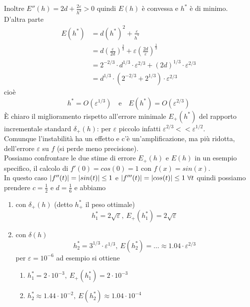 \documentclass[12pt,a4paper]{article}
\DeclarePairedDelimiter{\abs}{\lvert}{\rvert}
\begin{document}
Inoltre $E''(h) = 2d + \frac{2\varepsilon}{h^3} > 0$ quindi $E(h)$ è convessa e $h^*$ è di minimo.\\
D'altra parte
\[
\begin{split}
    E(h^*) & = d(h^*)^2 + \frac{\varepsilon}{h^*} \\
    & = d\left(\frac{\varepsilon}{2d}\right)^{\frac{2}{3}} + \varepsilon\left(\frac{2d}{\varepsilon}\right)^{\frac{1}{3}} \\
    & = 2^{-2/3} \cdot d^{1/3} \cdot \varepsilon^{2/3} + (2d)^{1/3} \cdot \varepsilon^{2/3} \\
    & = d^{1/3} \cdot (2^{-2/3} + 2^{1/3}) \cdot \varepsilon^{2/3}
\end{split}
\]
cioè
\[
h^* = O(\varepsilon^{1/3}) \quad \text{e} \quad E(h^*) = O(\varepsilon^{2/3})
\]
È chiaro il miglioramento
rispetto all'errore minimale $E_+(h^*)$ del rapporto incrementale standard $\delta_+(h)$: per $\varepsilon$ piccolo infatti $\varepsilon^{2/3} << \varepsilon^{1/2}$.\\
Comunque l'instabilità ha un effetto e c'è un'amplificazione, ma più ridotta, dell'errore $\varepsilon$ su $f$ (si perde meno precisione).\\
Possiamo confrontare le due stime di errore $E_+(h)$ e $E(h)$ in un esempio specifico, il calcolo di $f'(0) = cos(0) = 1$ con $f(x) = sin(x)$.\\
In questo caso $\abs{f''(t)} = \abs{sin(t)} \le 1$
e $\abs{f'''(t)} = \abs{cos(t)} \le 1 \ \forall t$ quindi possiamo prendere $c = \frac{1}{2}$ e $d = \frac{1}{6}$ e abbiamo
\begin{enumerate}
    \item con $\delta_+(h)$ (detto $h_+^*$ il peso ottimale)
    \[
        h_1^* = 2 \sqrt{\varepsilon}, \ E_+(h_1^*) = 2 \sqrt{\varepsilon}
    \]
    \item con $\delta(h)$
    \[
        h_2^* = 3^{1/3} \cdot \varepsilon^{1/3}, \ E(h_2^*) = \dotso \approx 1.04 \cdot \varepsilon^{2/3}
    \]
    per $\varepsilon = 10^{-6}$ ad esempio si ottiene
    \begin{enumerate}
        \item $h_1^* = 2 \cdot 10^{-3}, \ E_+(h_1^*) = 2 \cdot 10^{-3}$
        \item $h_2^* \approx 1.44 \cdot 10^{-2}, \ E(h_2^*) \approx 1.04 \cdot 10^{-4}$
    \end{enumerate}
\end{enumerate}
\end{document}
